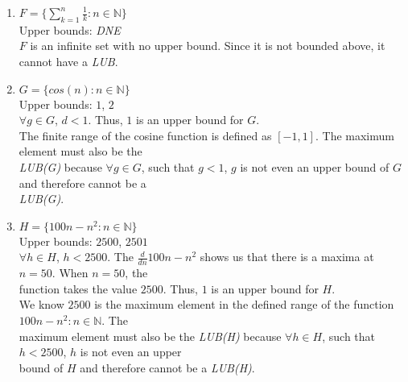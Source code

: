 \documentclass{article}
\begin{document}
\begin{flushleft}
\begin{enumerate}
\item $F = \{\sum_{k=1}^{n} \frac{1}{k} : n \in \mathbb{N}\}$\\

\vspace{.3cm}
\qquad Upper bounds: \emph{DNE}\\
\vspace{.3cm}
\qquad $F$ is an infinite set with no upper bound. Since it is not bounded above, it cannot have a \emph{LUB}. 
\vspace{.3cm}

\item $G = \{cos(n) : n \in \mathbb{N}\}$\\

\vspace{.3cm}
\qquad Upper bounds: $1$, $2$\\
\vspace{.3cm}
\qquad $\forall g \in G$, $d < 1$. Thus, $1$ is an upper bound for $G$. \\
\vspace{.3cm}
\qquad The finite range of the cosine function is defined as $[-1, 1]$. The maximum element must also be the \\
\qquad \emph{LUB(G)} because $\forall g \in G$, such that $g < 1$, $g$ is not even an upper bound of $G$ and therefore cannot be a\\ 
\qquad \emph{LUB(G)}. 
\vspace{.3cm}

\item $H = \{100n - n^2 : n \in \mathbb{N}\}$\\

\vspace{.3cm}
\qquad Upper bounds: $2500$, $2501$\\
\vspace{.3cm}
\qquad $\forall h \in H$, $h < 2500$. The $\frac{d}{dn}100n - n^2$ shows us that there is a maxima at $n=50$. When $n=50$, the \\
\qquad function takes the value $2500$. Thus, $1$ is an upper bound for $H$.\\
\vspace{.3cm}
\qquad We know $2500$ is the maximum element in the defined range of the function $100n - n^2 : n \in \mathbb{N}$.  The \\
\qquad maximum element must also be the \emph{LUB(H)} because $\forall h \in H$, such that $h < 2500$, $h$ is not even an upper \\
\qquad bound of $H$ and therefore cannot be a \emph{LUB(H)}. 
\vspace{.3cm}

\end{enumerate}
\end{flushleft}
\end{document}
